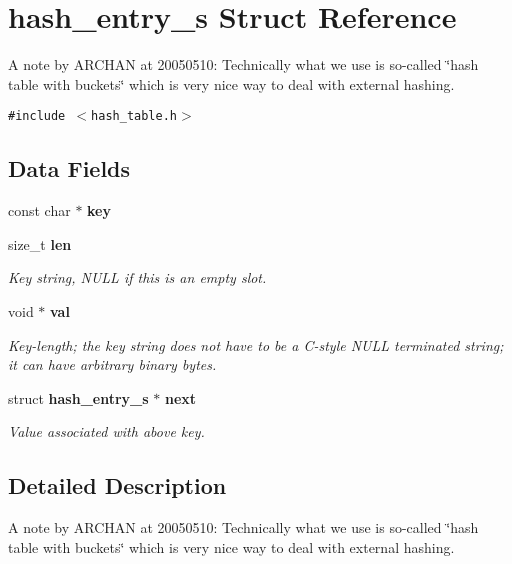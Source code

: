 \section{hash\_\-entry\_\-s Struct Reference}
\label{structhash__entry__s}
A note by ARCHAN at 20050510: Technically what we use is so-called \char`\"{}hash table with buckets\char`\"{} which is very nice way to deal with external hashing.  


{\tt \#include $<$hash\_\-table.h$>$}

\subsection*{Data Fields}
\begin{CompactItemize}
\item 
const char $\ast$ \textbf{key}\label{structhash__entry__s_2566ac1233761789585363a283385321}

\item 
size\_\-t {\bf len}
\begin{CompactList}\small\item\em Key string, NULL if this is an empty slot. \item\end{CompactList}\item 
void $\ast$ {\bf val}\label{structhash__entry__s_0d57012963084fed93886681108aa636}

\begin{CompactList}\small\item\em Key-length; the key string does not have to be a C-style NULL terminated string; it can have arbitrary binary bytes. \item\end{CompactList}\item 
struct {\bf hash\_\-entry\_\-s} $\ast$ {\bf next}\label{structhash__entry__s_a855ac854b9c36cf23f60d9ac8093e7f}

\begin{CompactList}\small\item\em Value associated with above key. \item\end{CompactList}\end{CompactItemize}


\subsection{Detailed Description}
A note by ARCHAN at 20050510: Technically what we use is so-called \char`\"{}hash table with buckets\char`\"{} which is very nice way to deal with external hashing. 

